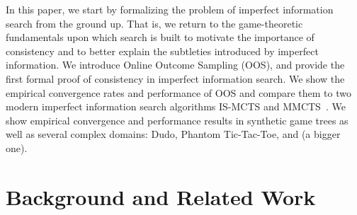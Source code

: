 \documentclass[letterpaper]{article}
\begin{document}
In this paper, we start by formalizing the problem of imperfect information search from the ground up. That is, we return to the game-theoretic 
fundamentals upon which search is built to motivate the importance of consistency and to better explain the subtleties introduced by imperfect 
information. 
We introduce Online Outcome Sampling (OOS), and provide the first formal proof of consistency in imperfect information search.
We show the empirical convergence rates and performance of OOS and compare them to two modern imperfect information search algorithms 
IS-MCTS and MMCTS~\cite{Cowling12ISMCTS,Auger11Multiple}.
We show empirical convergence and performance results in synthetic game trees as well as several complex domains: Dudo, Phantom Tic-Tac-Toe, 
and (a bigger one). 

\section{Background and Related Work}
\end{document}
